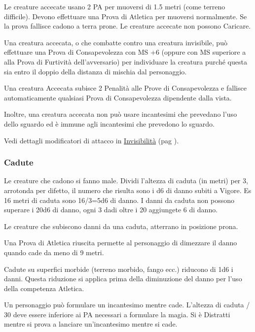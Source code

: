 \documentclass[12pt,a4paper,twoside,openany]{book}
\begin{document}
\begin{multicols}{2}
\label{accecato}

Le creature accecate usano 2 PA per muoversi di 1.5 metri (come terreno difficile). Devono effettuare una Prova di Atletica per muoversi normalmente. Se la prova fallisce cadono a terra prone. Le creature accecate non possono Caricare.

Una creatura accecata, o che combatte contro una creatura invisibile, può effettuare una Prova di Consapevolezza con MS +6 (oppure con MS superiore a alla Prova di Furtività dell'avversario) per individuare la creatura purché questa sia entro il doppio della distanza di mischia dal personaggio.

Una creatura Accecata subisce 2 Penalità alle Prove di Consapevolezza e fallisce automaticamente qualsiasi Prova di Consapevolezza dipendente dalla vista.

Inoltre, una creatura accecata non può usare incantesimi che prevedano l'uso dello sguardo ed è immune agli incantesimi che prevedono lo sguardo.

Vedi dettagli modificatori di attacco in \hyperlink{invisibilita}{Invisibilità} (pag \pageref{invisibilita}).

\subsubsection{Cadute}\hypertarget{cadute}{}

\label{cadute}

Le creature che cadono si fanno male. Dividi l'altezza di caduta (in metri) per 3, arrotonda per difetto, il numero che risulta sono i d6 di danno subiti a Vigore. Es 16 metri di caduta sono 16/3=5d6 di danno. I danni da caduta non possono superare i 20d6 di danno, ogni 3 dadi oltre i 20 aggiungete 6 di danno.

Le creature che subiscono danni da una caduta, atterrano in posizione prona.

Una Prova di Atletica riuscita permette al personaggio di dimezzare il danno quando cade da meno di 9 metri.

Cadute su superfici morbide (terreno morbido, fango ecc.) riducono di 1d6 i danni. Questa riduzione si applica prima della diminuzione del danno per l'uso della competenza Atletica.

Un personaggio può formulare un incantesimo mentre cade. L'altezza di caduta / 30 deve essere inferiore ai PA necessari a formulare la magia. Si è Distratti mentre si prova a lanciare un'incantesimo mentre si cade.


\end{multicols}
\end{document}

